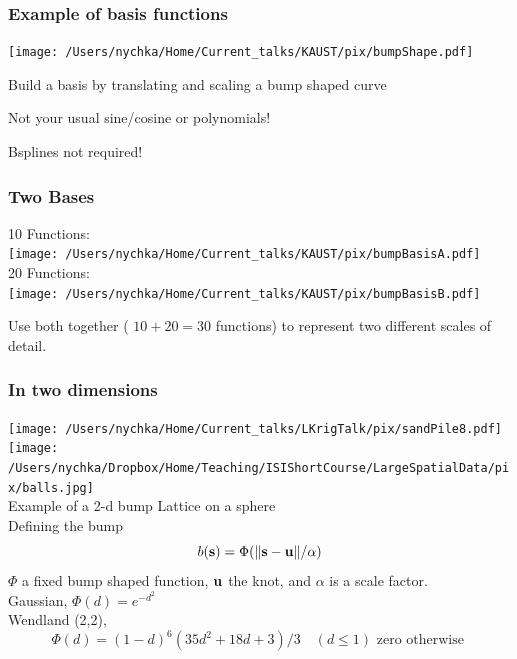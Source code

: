 \documentclass[english]{beamer} %
\def\Myspace{{\vspace*{.125in}}}
\begin{document}
\begin{frame} %
\frametitle{Example of basis functions}

\texttt{[image: /Users/nychka/Home/Current\_talks/KAUST/pix/bumpShape.pdf]}

\bdot Build a basis by translating and scaling a bump shaped curve

\bdot Not your usual sine/cosine or polynomials!

\bdot Bsplines not required!

\end{frame} %


 \begin{frame} %
 \frametitle{Two Bases}

10 Functions: \\
\texttt{[image: /Users/nychka/Home/Current\_talks/KAUST/pix/bumpBasisA.pdf]} \\
20 Functions: \\
\texttt{[image: /Users/nychka/Home/Current\_talks/KAUST/pix/bumpBasisB.pdf]}

Use both together  ( $10+20 = 30$ functions) to represent two different scales of detail.

\end{frame} %

\begin{frame} %
 \frametitle{In two dimensions}
 \texttt{[image: /Users/nychka/Home/Current\_talks/LKrigTalk/pix/sandPile8.pdf]} \hspace{.5in}
  \texttt{[image: /Users/nychka/Dropbox/Home/Teaching/ISIShortCourse/LargeSpatialData/pix/balls.jpg]}
 \\
 Example of a 2-d bump   \hspace{1in} Lattice on a sphere  \\
 
 \Myspace
 \Myspace
 Defining the bump
 \[ b(\mathbf{s}) =  \Phi( \| \mathbf{s} - \mathbf{u} \|/ \alpha )  \]
 $\Phi$  a fixed bump shaped function, $\mathbf{u}$ the knot, and $\alpha$ is a scale factor.  \\
 
 \bdot    Gaussian,  $ \Phi(d) = e^{-d^2}$  \\
 \bdot    Wendland  (2,2),  \[ \Phi(d) = (1- d)^6 ( 35d^2 + 18d  +3)/ 3  \quad (d \le 1 )  \mbox{ zero otherwise }  \]  

 \end{frame} %
\end{document}

